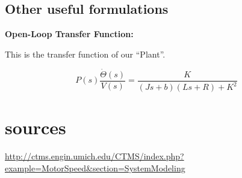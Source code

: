 \documentclass{article}
\begin{document}
\subsection{Other useful formulations}

\textbf{Open-Loop Transfer Function:}

This is the transfer function of our ``Plant''.

$$ P(s) \frac{\dot{\Theta}(s)}{V(s)} = \frac{K}{(Js+b)(Ls+R)+K^2} $$

\section{sources}
\url{http://ctms.engin.umich.edu/CTMS/index.php?example=MotorSpeed&section=SystemModeling}
\end{document}
